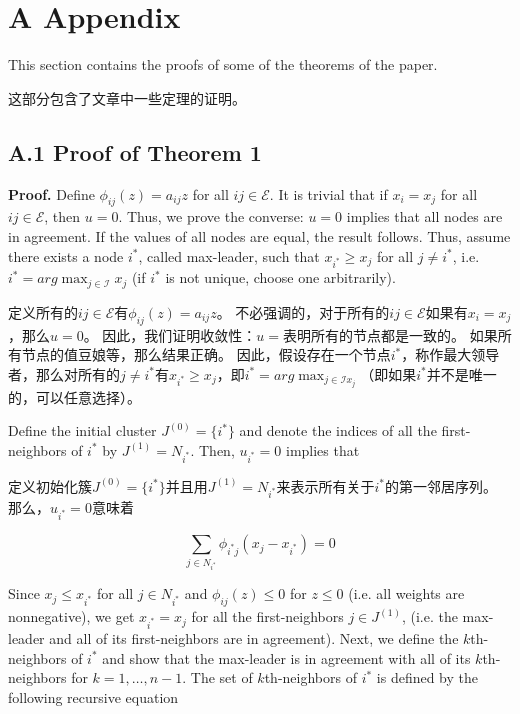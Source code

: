 \documentclass{article}
\begin{document}
\section*{A Appendix}
{\color[gray]{0.5}
This section contains the proofs of some of the theorems of the paper.
}

这部分包含了文章中一些定理的证明。

\subsection*{A.1 Proof of Theorem 1}
{\color[gray]{0.5}
\noindent \textbf{Proof.} Deﬁne $\phi_{ij}(z) = a_{ij}z$ for all $ij \in \mathcal{E}$. 
It is trivial that if $x_i=x_j$ for all $ij \in \mathcal{E}$, then $u=0$. 
Thus, we prove the converse: $u=0$ implies that all nodes are in agreement. 
If the values of all nodes are equal, the result follows. 
Thus, assume there exists a node $i^*$, called max-leader, such that $x_{i^*}\ge x_j$ for all $j\ne i^*$, i.e. $i^* = arg\max_{j\in \mathcal{I}} x_j$ (if $i^*$ is not unique, choose one arbitrarily).
}

\noindent 定义所有的$ij \in \mathcal{E}$有$\phi_{ij}(z) = a_{ij}z$。
不必强调的，对于所有的$ij \in \mathcal{E}$如果有$x_i = x_j$，那么$u=0$。
因此，我们证明收敛性：$u=$表明所有的节点都是一致的。
如果所有节点的值豆娘等，那么结果正确。
因此，假设存在一个节点$i^*$，称作最大领导者，那么对所有的$j\ne i^*$有$x_{i^*}\ge x_j$，即$i^* = arg\max_{j\in \mathcal{I} x_j}$（即如果$i^*$并不是唯一的，可以任意选择）。

{\color[gray]{0.5}
Deﬁne the initial cluster $J^{(0)}=\{ i^* \}$ and denote the indices of all the ﬁrst-neighbors of $i^*$ by $J^{(1)}=N_{i^*}$. 
Then, $u_{i^*}=0$ implies that
}

定义初始化簇$J^{(0)}=\{ i^* \}$并且用$J^{(1)}=N_{i^*}$来表示所有关于$i^*$的第一邻居序列。
那么，$u_{i^*}=0$意味着

\begin{equation}
    \tag{45}
    \label{45}
    \sum_{j\in N_{i^*}} \phi_{i^*j}(x_j-x_{i^*}) = 0
\end{equation}

{\color[gray]{0.5}
\noindent Since $x_j\le x_{i^*}$ for all $j\in N_{i^*}$ and $\phi_{ij}(z)\le 0$ for $z\le 0$ (i.e. all weights are nonnegative), we get $x_{i^*}=x_j$ for all the ﬁrst-neighbors $j\in J^{(1)}$, (i.e. the max-leader and all of its ﬁrst-neighbors are in agreement). 
Next, we deﬁne the $k$th-neighbors of $i^*$ and show that the max-leader is in agreement with all of its $k$th-neighbors for $k = 1,\dots, n − 1$. 
The set of $k$th-neighbors of $i^*$ is defined by the following recursive equation
}
\end{document}
